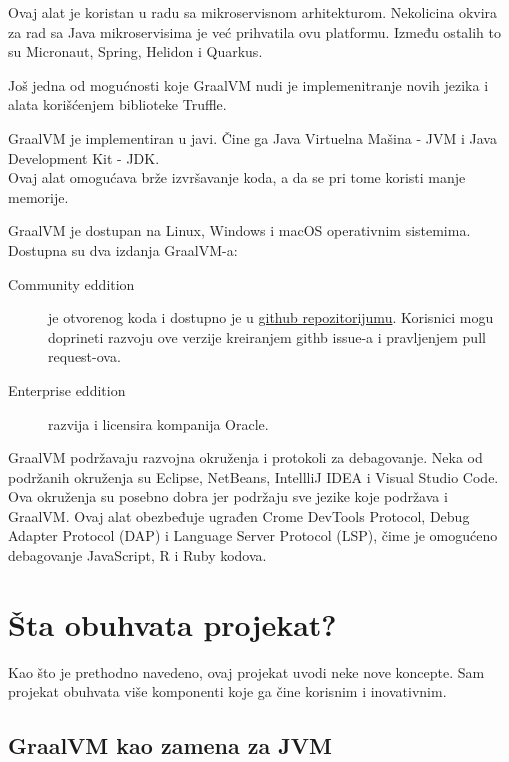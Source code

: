 \documentclass[a4paper]{article}
\begin{document}
Ovaj alat je koristan u radu sa mikroservisnom arhitekturom. Nekolicina okvira za rad sa Java mikroservisima je već prihvatila ovu platformu. Između ostalih to su Micronaut, Spring, Helidon i Quarkus. 

Još jedna od mogućnosti koje GraalVM nudi je implemenitranje novih jezika i alata korišćenjem biblioteke Truffle.

GraalVM je implementiran u javi. Čine ga Java Virtuelna Mašina - JVM i Java Development Kit - JDK. \\
Ovaj alat omogućava brže izvršavanje koda, a da se pri tome koristi manje memorije.

GraalVM je dostupan na Linux, Windows i macOS operativnim sistemima. \\

Dostupna su dva izdanja GraalVM-a:

\begin{description}
	\item [Community eddition] je otvorenog koda i dostupno je u \href{https://github.com/oracle/graal}{github repozitorijumu}. Korisnici mogu doprineti razvoju ove verzije kreiranjem githb issue-a i pravljenjem pull request-ova. \cite{graalvmCommunity}
	\item [Enterprise eddition] razvija i licensira kompanija Oracle. \cite{graalvmEnterprise}
\end{description}

GraalVM podržavaju razvojna okruženja i protokoli za debagovanje. Neka od podržanih okruženja su Eclipse, NetBeans, IntellliJ IDEA i Visual Studio Code. Ova okruženja su posebno dobra jer podržaju sve jezike koje podržava i GraalVM. Ovaj alat obezbeđuje ugrađen Crome DevTools Protocol, Debug Adapter Protocol (DAP) i Language Server Protocol (LSP), čime je omogućeno debagovanje JavaScript, R i Ruby kodova.

\section{Šta obuhvata projekat?}
\label{sec:Šta obuhvata projekat?}
Kao što je prethodno navedeno, ovaj projekat uvodi neke nove koncepte.
Sam projekat obuhvata više komponenti koje ga čine korisnim i inovativnim.

\subsection{GraalVM kao zamena za JVM}
\label{sub:GraalVM kao zamena za JVM}
\end{document}
